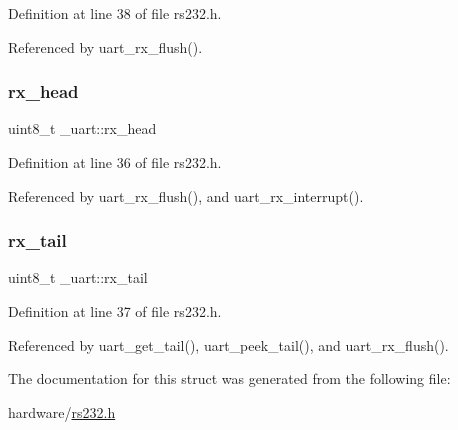 Definition at line 38 of file rs232.\+h.



Referenced by uart\+\_\+rx\+\_\+flush().

\mbox{\label{struct__uart_add14728bfbde14b7c260c8ff09bcd91b}} 
\subsubsection{\texorpdfstring{rx\+\_\+head}{rx\_head}}
{\footnotesize\ttfamily uint8\+\_\+t \+\_\+uart\+::rx\+\_\+head}



Definition at line 36 of file rs232.\+h.



Referenced by uart\+\_\+rx\+\_\+flush(), and uart\+\_\+rx\+\_\+interrupt().

\mbox{\label{struct__uart_a4bd6a544526fe5ac94a5f9af09e3bbeb}} 
\subsubsection{\texorpdfstring{rx\+\_\+tail}{rx\_tail}}
{\footnotesize\ttfamily uint8\+\_\+t \+\_\+uart\+::rx\+\_\+tail}



Definition at line 37 of file rs232.\+h.



Referenced by uart\+\_\+get\+\_\+tail(), uart\+\_\+peek\+\_\+tail(), and uart\+\_\+rx\+\_\+flush().



The documentation for this struct was generated from the following file\+:\begin{DoxyCompactItemize}
\item 
hardware/\hyperlink{rs232_8h}{rs232.\+h}\end{DoxyCompactItemize}

